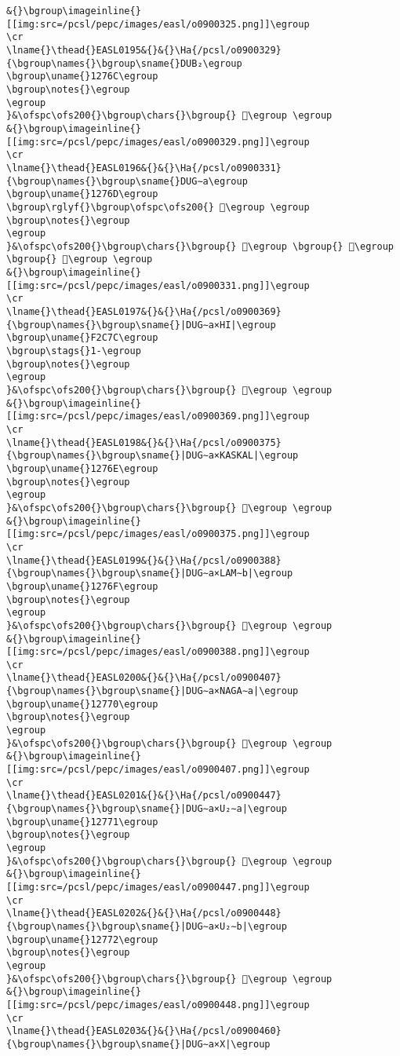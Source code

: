 \begin{verbatim}
&{}\bgroup\imageinline{}[[img:src=/pcsl/pepc/images/easl/o0900325.png]]\egroup
\cr
\lname{}\thead{}EASL0195&{}&{}\Ha{/pcsl/o0900329}{\bgroup\names{}\bgroup\sname{}DUB₂\egroup
\bgroup\uname{}1276C\egroup
\bgroup\notes{}\egroup
\egroup
}&\ofspc\ofs200{}\bgroup\chars{}\bgroup{} 𒝬\egroup \egroup
&{}\bgroup\imageinline{}[[img:src=/pcsl/pepc/images/easl/o0900329.png]]\egroup
\cr
\lname{}\thead{}EASL0196&{}&{}\Ha{/pcsl/o0900331}{\bgroup\names{}\bgroup\sname{}DUG∼a\egroup
\bgroup\uname{}1276D\egroup
\bgroup\rglyf{}\bgroup\ofspc\ofs200{} 𒝭\egroup \egroup
\bgroup\notes{}\egroup
\egroup
}&\ofspc\ofs200{}\bgroup\chars{}\bgroup{} 𒝶\egroup \bgroup{} 𒝵\egroup \bgroup{} 𒝭\egroup \egroup
&{}\bgroup\imageinline{}[[img:src=/pcsl/pepc/images/easl/o0900331.png]]\egroup
\cr
\lname{}\thead{}EASL0197&{}&{}\Ha{/pcsl/o0900369}{\bgroup\names{}\bgroup\sname{}|DUG∼a×HI|\egroup
\bgroup\uname{}F2C7C\egroup
\bgroup\stags{}1-\egroup
\bgroup\notes{}\egroup
\egroup
}&\ofspc\ofs200{}\bgroup\chars{}\bgroup{} 󲱼\egroup \egroup
&{}\bgroup\imageinline{}[[img:src=/pcsl/pepc/images/easl/o0900369.png]]\egroup
\cr
\lname{}\thead{}EASL0198&{}&{}\Ha{/pcsl/o0900375}{\bgroup\names{}\bgroup\sname{}|DUG∼a×KASKAL|\egroup
\bgroup\uname{}1276E\egroup
\bgroup\notes{}\egroup
\egroup
}&\ofspc\ofs200{}\bgroup\chars{}\bgroup{} 𒝮\egroup \egroup
&{}\bgroup\imageinline{}[[img:src=/pcsl/pepc/images/easl/o0900375.png]]\egroup
\cr
\lname{}\thead{}EASL0199&{}&{}\Ha{/pcsl/o0900388}{\bgroup\names{}\bgroup\sname{}|DUG∼a×LAM∼b|\egroup
\bgroup\uname{}1276F\egroup
\bgroup\notes{}\egroup
\egroup
}&\ofspc\ofs200{}\bgroup\chars{}\bgroup{} 𒝯\egroup \egroup
&{}\bgroup\imageinline{}[[img:src=/pcsl/pepc/images/easl/o0900388.png]]\egroup
\cr
\lname{}\thead{}EASL0200&{}&{}\Ha{/pcsl/o0900407}{\bgroup\names{}\bgroup\sname{}|DUG∼a×NAGA∼a|\egroup
\bgroup\uname{}12770\egroup
\bgroup\notes{}\egroup
\egroup
}&\ofspc\ofs200{}\bgroup\chars{}\bgroup{} 𒝰\egroup \egroup
&{}\bgroup\imageinline{}[[img:src=/pcsl/pepc/images/easl/o0900407.png]]\egroup
\cr
\lname{}\thead{}EASL0201&{}&{}\Ha{/pcsl/o0900447}{\bgroup\names{}\bgroup\sname{}|DUG∼a×U₂∼a|\egroup
\bgroup\uname{}12771\egroup
\bgroup\notes{}\egroup
\egroup
}&\ofspc\ofs200{}\bgroup\chars{}\bgroup{} 𒝱\egroup \egroup
&{}\bgroup\imageinline{}[[img:src=/pcsl/pepc/images/easl/o0900447.png]]\egroup
\cr
\lname{}\thead{}EASL0202&{}&{}\Ha{/pcsl/o0900448}{\bgroup\names{}\bgroup\sname{}|DUG∼a×U₂∼b|\egroup
\bgroup\uname{}12772\egroup
\bgroup\notes{}\egroup
\egroup
}&\ofspc\ofs200{}\bgroup\chars{}\bgroup{} 𒝲\egroup \egroup
&{}\bgroup\imageinline{}[[img:src=/pcsl/pepc/images/easl/o0900448.png]]\egroup
\cr
\lname{}\thead{}EASL0203&{}&{}\Ha{/pcsl/o0900460}{\bgroup\names{}\bgroup\sname{}|DUG∼a×X|\egroup

\end{verbatim}
